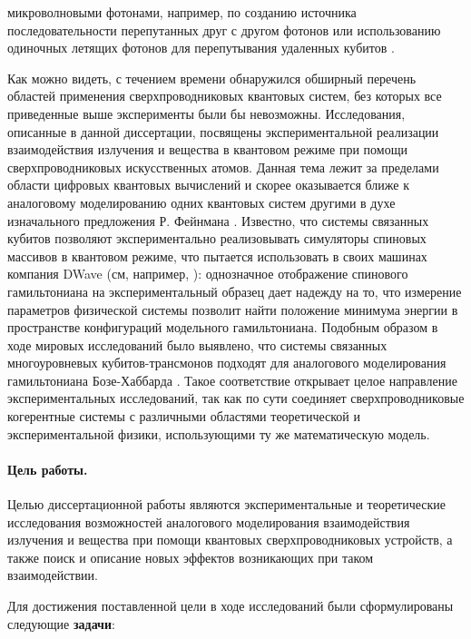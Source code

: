 \documentclass[14pt, a4paper]{extarticle}
\begin{document}
микроволновыми фотонами, например, по созданию источника последовательности перепутанных друг с другом фотонов \cite{besse2020realizing} или использованию одиночных летящих фотонов для перепутывания удаленных кубитов \cite{kurpiers2018deterministic}.

Как можно видеть, с течением времени обнаружился обширный перечень областей применения сверхпроводниковых квантовых систем, без которых все приведенные выше эксперименты были бы невозможны. Исследования, описанные в данной диссертации, посвящены экспериментальной реализации взаимодействия излучения и вещества в квантовом режиме при помощи сверхпроводниковых искусственных атомов. Данная тема лежит за пределами области цифровых квантовых вычислений и скорее оказывается ближе к аналоговому моделированию одних квантовых систем другими в духе изначального предложения Р. Фейнмана \cite{feynman1982simulating}. Известно, что системы связанных кубитов позволяют экспериментально реализовывать симуляторы спиновых массивов в квантовом режиме, что пытается использовать в своих машинах компания DWave (см, например, \cite{harris2018phase}): однозначное отображение спинового гамильтониана на экспериментальный образец дает надежду на то, что измерение параметров физической системы позволит найти положение минимума энергии в пространстве конфигураций модельного гамильтониана. Подобным образом в ходе мировых исследований было выявлено, что системы связанных многоуровневых кубитов\hyp трансмонов подходят для аналогового моделирования гамильтониана Бозе-Хаббарда \cite{Orell2019, Ma2019, Hacohen-Gourgy2015, Deng2016, Ye2019, Yan2019}. Такое соответствие открывает целое направление экспериментальных исследований, так как по сути соединяет сверхпроводниковые когерентные системы с различными областями теоретической и экспериментальной физики, использующими ту же математическую модель.

\paragraph{Цель работы.} Целью диссертационной работы являются экспериментальные и теоретические исследования возможностей аналогового моделирования взаимодействия излучения и вещества при помощи квантовых сверхпроводниковых устройств, а также поиск и описание новых эффектов возникающих при таком взаимодействии.

Для достижения поставленной цели в ходе исследований были сформулированы следующие \textbf{задачи}:
\end{document}
